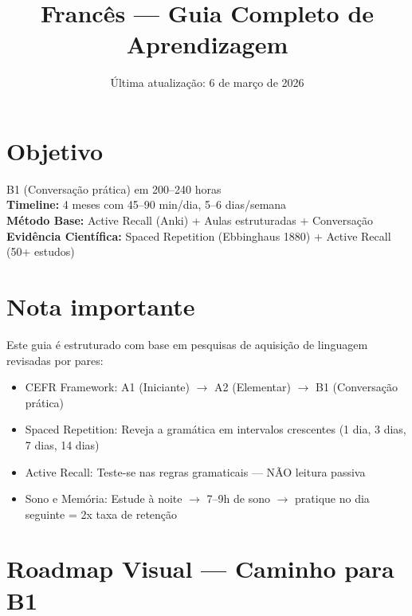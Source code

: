 \documentclass[a4paper,12pt]{article}
\title{Francês --- Guia Completo de Aprendizagem}
\author{}
\date{Última atualização: 6 de março de 2026}
\begin{document}
\maketitle

\section*{Objetivo}
B1 (Conversação prática) em 200--240 horas \\
\textbf{Timeline:} 4 meses com 45--90 min/dia, 5--6 dias/semana \\
\textbf{Método Base:} Active Recall (Anki) + Aulas estruturadas + Conversação \\
\textbf{Evidência Científica:} Spaced Repetition (Ebbinghaus 1880) + Active Recall (50+ estudos)

\section*{Nota importante}
Este guia é estruturado com base em pesquisas de aquisição de linguagem revisadas por pares:
\begin{itemize}
    \item CEFR Framework: A1 (Iniciante) $\to$ A2 (Elementar) $\to$ B1 (Conversação prática)
    \item Spaced Repetition: Reveja a gramática em intervalos crescentes (1 dia, 3 dias, 7 dias, 14 dias)
    \item Active Recall: Teste-se nas regras gramaticais — NÃO leitura passiva
    \item Sono e Memória: Estude à noite $\to$ 7--9h de sono $\to$ pratique no dia seguinte = 2x taxa de retenção
\end{itemize}

\tableofcontents
\newpage

\section{Roadmap Visual — Caminho para B1}
\end{document}
